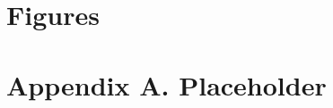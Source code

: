 \documentclass[12pt]{article}
\begin{document}
	
	
	\clearpage
	
	\section*{Figures} \label{sec:fig}
	
	
	
	
	
	\clearpage
	
	\section*{Appendix A. Placeholder} \label{sec:appendixa}
	
	
\end{document}

